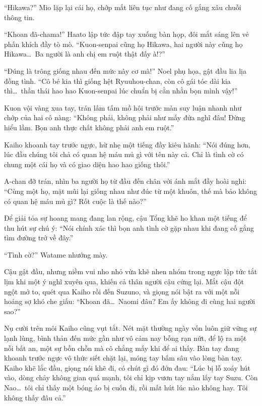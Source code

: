 \documentclass[../main.tex]{subfiles}
\begin{document}
``Hikawa?'' Mio lặp lại cái họ, chớp mắt liên tục như đang cố gắng xâu chuỗi thông tin.

``Khoan đã-chama!'' Haato lập tức đập tay xuống bàn họp, đôi mắt sáng lên vẻ phấn khích đầy tò mò. ``Kuon-senpai cũng họ Hikawa, hai người này cũng họ Hikawa\dots\ Ba người là anh chị em ruột thật đấy à!?''

``Đúng là trông giống nhau đến mức này cơ mà!'' Noel phụ họa, gật đầu lia lịa đồng tình. ``Cô bé kia thì giống hệt Ryuuhou-chan, còn cô gái tóc dài kia thì\dots\ thần thái hao hao Kuon-senpai lúc chuẩn bị cằn nhằn bọn mình vậy!''

Kuon vội vàng xua tay, trán lấm tấm mồ hôi trước màn suy luận nhanh như chớp của hai cô nàng: ``Không phải, không phải như mấy đứa nghĩ đâu! Đừng hiểu lầm. Bọn anh thực chất không phải anh em ruột.''

Kaiho khoanh tay trước ngực, hừ nhẹ một tiếng đầy kiêu hãnh: ``Nói đúng hơn, lúc đầu chúng tôi chả có quan hệ máu mủ gì với tên này cả. Chỉ là tình cờ có chung một cái họ và có giao diện hao hao giống thôi.''

A-chan đỡ trán, nhìn ba người họ từ đầu đến chân với ánh mắt đầy hoài nghi: ``Cùng một họ, mặt mũi lại giống nhau như đúc từ một khuôn, thế mà bảo không có quan hệ máu mủ gì? Rốt cuộc là thế nào?''

Để giải tỏa sự hoang mang đang lan rộng, cậu Tổng khẽ ho khan một tiếng để thu hút sự chú ý: ``Nói chính xác thì bọn anh tình cờ gặp nhau khi đang cố gắng tìm đường trở về đây.''

``Tình cờ?'' Watame nhướng mày.

Cậu gật đầu, nhưng niềm vui nho nhỏ vừa khẽ nhen nhóm trong ngực lập tức tắt lịm khi một ý nghĩ xuyên qua, khiến cả thân người cậu cứng lại. Mắt cậu đột ngột mở to, quét qua Kaiho rồi đến Suzuno, và giọng nói bật ra với một nỗi hoảng sợ khó che giấu: ``Khoan đã\dots\ Naomi đâu? Em ấy không đi cùng hai người sao?''

Nụ cười trên môi Kaiho cũng vụt tắt. Nét mặt thường ngày vốn luôn giữ vững sự lạnh lùng, bình thản đến mức gần như vô cảm nay bỗng rạn nứt, để lộ ra một nỗi bất an, một sự bồn chồn mà cô chẳng mấy khi để ai thấy. Bàn tay đang khoanh trước ngực vô thức siết chặt lại, móng tay bấm sâu vào lòng bàn tay. Kaiho khẽ lắc đầu, giọng nói khẽ đi, có chút gì đó đớn đau: ``Lúc bị lỗ xoáy hút vào, dòng chảy không gian quá mạnh, tôi chỉ kịp vươn tay nắm lấy tay Suzu. Còn Nao\dots\ tôi chỉ thấy một bóng áo bị cuốn đi, rồi mất hút lúc nào không hay. Tôi không thấy đâu cả.''
\end{document}
